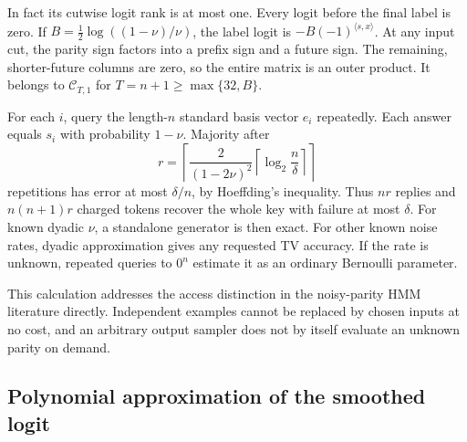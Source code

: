 \documentclass[11pt]{article}
\theoremstyle{definition}
\theoremstyle{remark}
\begin{document}
In fact its cutwise logit rank is at most one. Every logit before the final label is zero. If $B=\tfrac12\log((1-\nu)/\nu)$, the label logit is $-B(-1)^{\langle s,x\rangle}$. At any input cut, the parity sign factors into a prefix sign and a future sign. The remaining, shorter-future columns are zero, so the entire matrix is an outer product.
It belongs to $\mathcal C_{T,1}$ for $T=n+1\ge\max\{32,B\}$.

For each $i$, query the length-$n$ standard basis vector $e_i$ repeatedly. Each answer equals $s_i$ with probability $1-\nu$. Majority after
\[
r=\left\lceil\frac{2}{(1-2\nu)^2}\left\lceil\log_2\frac n\delta\right\rceil\right\rceil
\]
repetitions has error at most $\delta/n$, by Hoeffding's inequality. Thus $nr$ replies and $n(n+1)r$ charged tokens recover the whole key with failure at most $\delta$. For known dyadic $\nu$, a standalone generator is then exact. For other known noise rates, dyadic approximation gives any requested TV accuracy. If the rate is unknown, repeated queries to $0^n$ estimate it as an ordinary Bernoulli parameter.

This calculation addresses the access distinction in the noisy-parity HMM literature directly. Independent examples cannot be replaced by chosen inputs at no cost, and an arbitrary output sampler does not by itself evaluate an unknown parity on demand.

\subsection{Polynomial approximation of the smoothed logit}\label{sec:proof-softclip}
\end{document}
